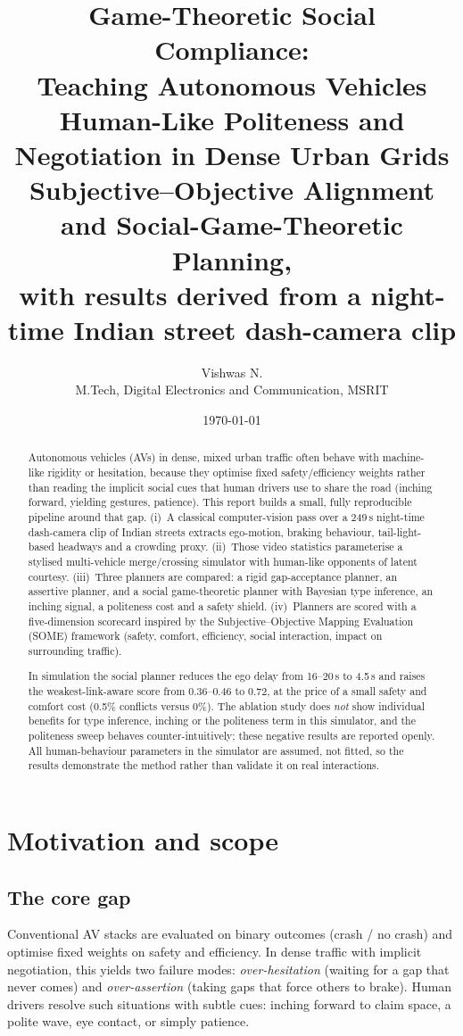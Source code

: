 \documentclass[11pt,a4paper]{article}
\title{\textbf{Game-Theoretic Social Compliance:\\ Teaching Autonomous Vehicles Human-Like Politeness and\\ Negotiation in Dense Urban Grids}\\[4pt]
\large Subjective--Objective Alignment and Social-Game-Theoretic Planning,\\ with results derived from a night-time Indian street dash-camera clip}
\author{Vishwas N.\\ M.Tech, Digital Electronics and Communication, MSRIT}
\date{\today}
\begin{document}
\maketitle

\begin{abstract}
Autonomous vehicles (AVs) in dense, mixed urban traffic often behave with machine-like rigidity or hesitation, because they optimise fixed safety/efficiency weights rather than reading the implicit social cues that human drivers use to share the road (inching forward, yielding gestures, patience). This report builds a small, fully reproducible pipeline around that gap. (i)~A classical computer-vision pass over a 249\,s night-time dash-camera clip of Indian streets extracts ego-motion, braking behaviour, tail-light-based headways and a crowding proxy. (ii)~Those video statistics parameterise a stylised multi-vehicle merge/crossing simulator with human-like opponents of latent courtesy. (iii)~Three planners are compared: a rigid gap-acceptance planner, an assertive planner, and a social game-theoretic planner with Bayesian type inference, an inching signal, a politeness cost and a safety shield. (iv)~Planners are scored with a five-dimension scorecard inspired by the Subjective--Objective Mapping Evaluation (SOME) framework (safety, comfort, efficiency, social interaction, impact on surrounding traffic).

In simulation the social planner reduces the ego delay from 16--20\,s to 4.5\,s and raises the weakest-link-aware score from 0.36--0.46 to 0.72, at the price of a small safety and comfort cost (0.5\% conflicts versus 0\%). The ablation study does \emph{not} show individual benefits for type inference, inching or the politeness term in this simulator, and the politeness sweep behaves counter-intuitively; these negative results are reported openly. All human-behaviour parameters in the simulator are assumed, not fitted, so the results demonstrate the method rather than validate it on real interactions.
\end{abstract}

\section{Motivation and scope}
\subsection*{The core gap}
Conventional AV stacks are evaluated on binary outcomes (crash / no crash) and optimise fixed weights on safety and efficiency. In dense traffic with implicit negotiation, this yields two failure modes: \emph{over-hesitation} (waiting for a gap that never comes) and \emph{over-assertion} (taking gaps that force others to brake). Human drivers resolve such situations with subtle cues: inching forward to claim space, a polite wave, eye contact, or simply patience.
\end{document}

